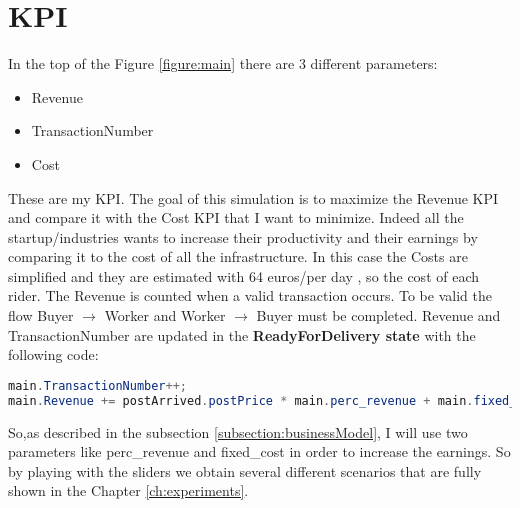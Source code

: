 \chapter{KPI}\label{ch:KPI}
In the top of the Figure \ref{figure:main} there are 3 different parameters:
\begin{itemize}
\item Revenue
\item TransactionNumber
\item Cost
\end{itemize}
These are my KPI. The goal of this simulation is to maximize the Revenue KPI and compare it with the Cost KPI that I want to minimize. Indeed all the startup/industries wants to increase their productivity and their earnings by comparing it to the cost of all the infrastructure. In this case the Costs are simplified and they are estimated with 64 euros/per day , so the cost of each rider.
The Revenue is counted when a valid transaction occurs. To be valid the flow Buyer $\rightarrow$ Worker and Worker $\rightarrow$ Buyer must be completed. Revenue and TransactionNumber are updated in the \textbf{ReadyForDelivery state} with the following code: 
\begin{lstlisting}[language=Java]
main.TransactionNumber++;
main.Revenue += postArrived.postPrice * main.perc_revenue + main.fixed_cost;
\end{lstlisting}
So,as described in the subsection \ref{subsection:businessModel}, I will use two parameters like perc\_revenue and  fixed\_cost in order to increase the earnings. So by playing with the sliders we obtain several different scenarios that are fully shown in the Chapter \ref{ch:experiments}.